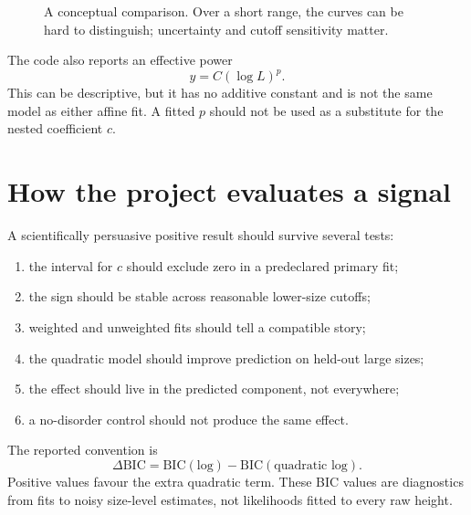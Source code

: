\documentclass[11pt,a4paper,oneside,openany]{memoir}
\newcommand{\1}{\bm{1}}
\begin{document}
\begin{figure}[H]
\centering
{}
\caption{A conceptual comparison. Over a short range, the curves can be hard to distinguish; uncertainty and cutoff sensitivity matter.}
\end{figure}

The code also reports an effective power
\[
  y=C(\log L)^p.
\]
This can be descriptive, but it has no additive constant and is not the same
model as either affine fit. A fitted $p$ should not be used as a substitute for
the nested coefficient $c$.

\section{How the project evaluates a signal}

A scientifically persuasive positive result should survive several tests:

\begin{enumerate}
  \item the interval for $c$ should exclude zero in a predeclared primary fit;
  \item the sign should be stable across reasonable lower-size cutoffs;
  \item weighted and unweighted fits should tell a compatible story;
  \item the quadratic model should improve prediction on held-out large sizes;
  \item the effect should live in the predicted component, not everywhere;
  \item a no-disorder control should not produce the same effect.
\end{enumerate}

The reported convention is
\[
  \Delta\mathrm{BIC}=\mathrm{BIC}(\text{log})-\mathrm{BIC}(\text{quadratic log}).
\]
Positive values favour the extra quadratic term. These BIC values are
diagnostics from fits to noisy size-level estimates, not likelihoods fitted to
every raw height.
\end{document}
